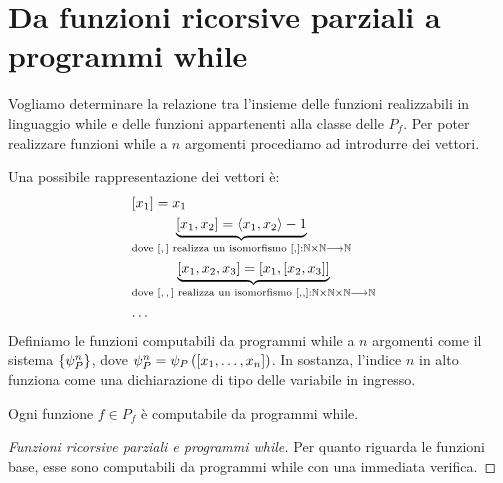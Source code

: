 \documentclass{lectures}
\begin{document}
\section{Da funzioni ricorsive parziali a programmi while}
\begin{multicols}{2}
    Vogliamo determinare la relazione tra l'insieme delle funzioni realizzabili in linguaggio while e delle funzioni appartenenti alla classe delle \(P_f\). Per poter realizzare funzioni while a \(n\) argomenti procediamo ad introdurre dei vettori.
    \begin{definition}
        Una possibile rappresentazione dei vettori è:
        \begin{align*}
            &\left[x_1\right] = x_1 &\\
            &\underbrace{\left[x_1, x_2\right] = \left\langle x_1, x_2\right\rangle - 1}_{\text{dove \(\left[,\right]\) realizza un isomorfismo }\left[,\right]:\mathbb{N} \times \mathbb{N}\longrightarrow \mathbb{N}}\\
            &\underbrace{\left[x_1, x_2, x_3\right] = \left[x_1, \left[x_2, x_3\right]\right]}_{\text{dove \(\left[,,\right]\) realizza un isomorfismo }\left[,,\right]:\mathbb{N} \times \mathbb{N}\times \mathbb{N}\longrightarrow \mathbb{N}}\\
            & \ldots
        \end{align*}
        Definiamo le funzioni computabili da programmi while a \(n\) argomenti come il sistema \(\left\{\psi_P^n\right\}\), dove \(\psi_P^n = \psi_P\left(\left[x_1, \ldots, x_n\right]\right)\). In sostanza, l'indice \(n\) in alto funziona come una dichiarazione di tipo delle variabile in ingresso.
    \end{definition}
    \begin{theorem}
        Ogni funzione \(f \in P_f\) è computabile da programmi while.
    \end{theorem}
    \begin{proof}[Funzioni ricorsive parziali e programmi while]
        Per quanto riguarda le funzioni base, esse sono computabili da programmi while con una immediata verifica.
        

\end{proof}
\end{multicols}
\end{document}
